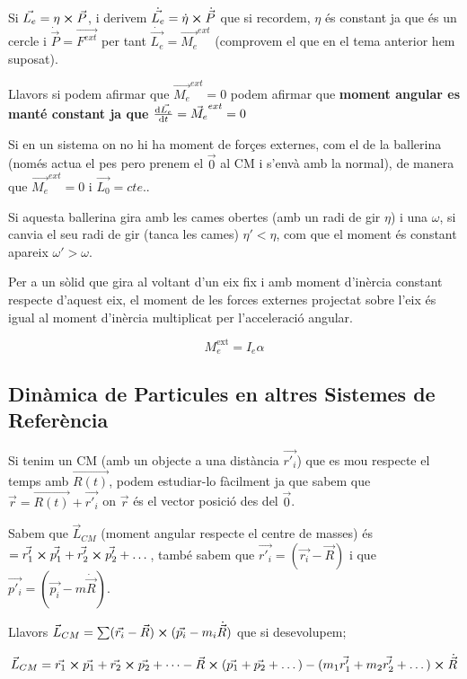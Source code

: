\documentclass[12pt]{article}
\begin{document}
Si $\vec{L_e} = \eta\cross \vec{P}$, i derivem $\dot{\vec{L_e}} = \dot{\eta}\cross \dot{\vec{P}}$ que si recordem, $\eta$ és constant ja que és un cercle i $\dot{\vec{P}} = \vec{F^{ext}}$ per tant $\dot{\vec{L_e}} = \vec{M_e}^{ext}$ (comprovem el que en el tema anterior hem suposat).

Llavors si podem afirmar que $\vec{M_e}^{ext} = 0$ podem afirmar que \textbf{moment angular es manté constant ja que} $\dv{\vec{L_e}}{t} = \vec{M_e}^{ext} = 0$

Si en un sistema on no hi ha moment de forçes externes, com el de la ballerina (només actua el pes pero prenem el $\vec{0}$ al CM i s'envà amb la normal), de manera que $\vec{M_e}^{ext} = 0$ i $\vec{L_0} = cte.$.

Si aquesta ballerina gira amb les cames obertes (amb un radi de gir $\eta$) i una $\omega$, si canvia el seu radi de gir (tanca les cames) $\eta' < \eta$, com que el moment és constant apareix $\omega' > \omega$.

Per a un sòlid que gira al voltant d’un eix fix i amb moment d’inèrcia constant respecte d’aquest eix, el moment de les forces externes projectat sobre l’eix és igual al moment d’inèrcia multiplicat per l’acceleració angular.

\[
M_e^{\mathrm{ext}}=I_e\alpha
\]

\subsection{Dinàmica de Particules en altres Sistemes de Referència}

Si tenim un CM (amb un objecte a una distància $\vec{r'_i}$) que es mou respecte el temps amb $\vec{R(t)}$, podem estudiar-lo fàcilment ja que sabem que $\vec{r} = \vec{R(t)} + \vec{r'_i}$ on $\vec{r}$ és el vector posició des del $\vec{0}$.

Sabem que $\vec{L}_{CM}$ (moment angular respecte el centre de masses) és $= \vec{r'_1}\cross\vec{p'_1} + \vec{r'_2}\cross\vec{p'_2} + \dots$, també sabem que $\vec{r'_i} = (\vec{r_i} - \vec{R})$ i que $\vec{p'_i} = (\vec{p_i} - m\dot{\vec{R}})$.

Llavors $\vec{L}_{CM} = \sum(\vec{r_i}- \vec{R}) \cross (\vec{p_i} - m_i\dot{\vec{R}})$ que si desevolupem;

\[\vec{L}_{CM} = \vec{r_1} \cross \vec{p_1} + \vec{r_2} \cross \vec{p_2} + \dots - \vec{R}\cross(\vec{p_1} + \vec{p_2} + \dots) - (m_1\vec{r'_1} + m_2\vec{r'_2}+ \dots)\cross \dot{\vec{R}}\]
\end{document}
